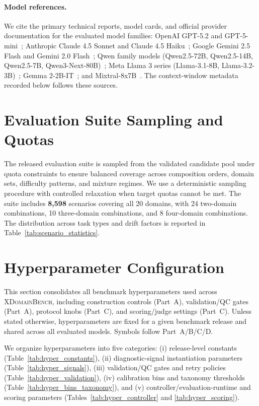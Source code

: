 \paragraph{Model references.}
We cite the primary technical reports, model cards, and official provider documentation for the evaluated model families:
OpenAI GPT-5.2 and GPT-5-mini~\citep{openai2025gpt52,openai2026gpt52api};
Anthropic Claude 4.5 Sonnet and Claude 4.5 Haiku~\citep{anthropic2026claudeModels};
Google Gemini 2.5 Flash and Gemini 2.0 Flash~\citep{google2026geminiModels};
Qwen family models (Qwen2.5-72B, Qwen2.5-14B, Qwen2.5-7B, Qwen3-Next-80B)~\citep{bai2023qwen,qwen2024qwen25,qwen2025qwen3next};
Meta Llama 3 series (Llama-3.1-8B, Llama-3.2-3B)~\citep{aiAtMeta2024llama3,metaLlama31Blog,metaLlama32Models};
Gemma 2-2B-IT~\citep{gemmaTeam2024gemma2};
and Mixtral-8x7B~\citep{mistral2023mixtral,mistral2026mixtral8x7bcard}.
The context-window metadata recorded below follows these sources.

\section{Evaluation Suite Sampling and Quotas}
\label{app:sample_composition}

The released evaluation suite is sampled from the validated candidate pool under quota constraints to ensure balanced coverage across composition orders, domain sets, difficulty patterns, and mixture regimes. We use a deterministic sampling procedure with controlled relaxation when target quotas cannot be met. The suite includes \textbf{8,598} scenarios covering all 20 domains, with 24 two-domain combinations, 10 three-domain combinations, and 8 four-domain combinations. The distribution across task types and drift factors is reported in Table~\ref{tab:scenario_statistics}.

\section{Hyperparameter Configuration}
\label{app:hyperparameters}

This section consolidates all benchmark hyperparameters used across \textsc{XDomainBench}, including construction controls (Part~A), validation/QC gates (Part~A), protocol knobs (Part~C), and scoring/judge settings (Part~C). Unless stated otherwise, hyperparameters are fixed for a given benchmark release and shared across all evaluated models. Symbols follow Part~A/B/C/D.

We organize hyperparameters into five categories: (i) release-level constants (Table~\ref{tab:hyper_constants}), (ii) diagnostic-signal instantiation parameters (Table~\ref{tab:hyper_signals}), (iii) validation/QC gates and retry policies (Table~\ref{tab:hyper_validation}), (iv) calibration bins and taxonomy thresholds (Table~\ref{tab:hyper_bins_taxonomy}), and (v) controller/evaluation-runtime and scoring parameters (Tables~\ref{tab:hyper_controller} and \ref{tab:hyper_scoring}).

